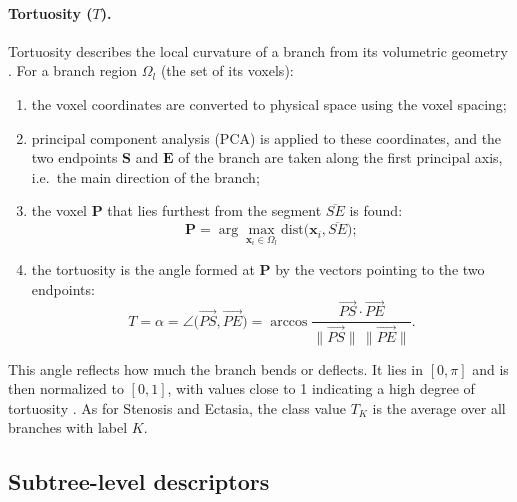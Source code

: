 \paragraph{Tortuosity ($T$).}            %
Tortuosity describes the local curvature of a branch from its volumetric
geometry \cite{zhang2025airmorph}. For a branch region $\Omega_l$ (the set of its voxels):
\begin{enumerate}                        %
  \item the voxel coordinates are converted to physical space using the voxel spacing;
  \item principal component analysis (PCA) is applied to these coordinates, and the two
        endpoints $\mathbf{S}$ and $\mathbf{E}$ of the branch are taken along the first
        principal axis, i.e.\ the main direction of the branch;
  \item the voxel $\mathbf{P}$ that lies furthest from the segment $\overline{SE}$ is
        found:
        \begin{equation}
          \mathbf{P} = \arg\max_{\mathbf{x}_i \in \Omega_l}
              \mathrm{dist}\big(\mathbf{x}_i, \overline{SE}\big);
          \label{eq:morph_tort_p}        %
        \end{equation}
  \item the tortuosity is the angle formed at $\mathbf{P}$ by the vectors pointing to the
        two endpoints:
        \begin{equation}
          T = \alpha = \angle\big(\overrightarrow{PS}, \overrightarrow{PE}\big)
            = \arccos \frac{\overrightarrow{PS} \cdot \overrightarrow{PE}}
                           {\|\overrightarrow{PS}\|\,\|\overrightarrow{PE}\|}.
          \label{eq:morph_tort_alpha}    %
        \end{equation}
\end{enumerate}
This angle reflects how much the branch bends or deflects. It lies in $[0, \pi]$ and is then
normalized to $[0, 1]$, with values close to 1 indicating a high degree of
tortuosity \cite{zhang2025airmorph}. As for Stenosis and Ectasia, the class value $T_K$ is the average over
all branches with label $K$.

\subsection{Subtree-level descriptors}   %
\label{sec:morph_subtree}                %


